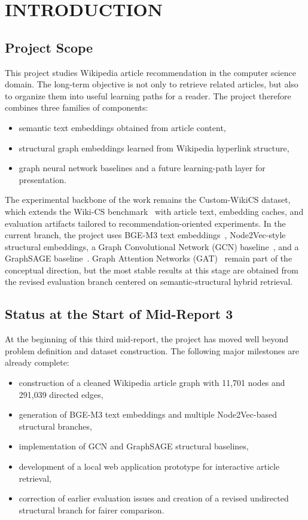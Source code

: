 \chapter{INTRODUCTION}
\thispagestyle{empty}

\section{Project Scope}

This project studies Wikipedia article recommendation in the computer science
domain. The long-term objective is not only to retrieve related articles, but
also to organize them into useful learning paths for a reader. The project
therefore combines three families of components:
\begin{itemize}
    \item semantic text embeddings obtained from article content,
    \item structural graph embeddings learned from Wikipedia hyperlink
    structure,
    \item graph neural network baselines and a future learning-path layer for
    presentation.
\end{itemize}

The experimental backbone of the work remains the Custom-WikiCS dataset, which
extends the Wiki-CS benchmark~\cite{mernyei2020wikics} with article text,
embedding caches, and evaluation artifacts tailored to recommendation-oriented
experiments. In the current branch, the project uses BGE-M3 text
embeddings~\cite{chen2025bgem3}, Node2Vec-style structural embeddings, a
Graph Convolutional Network (GCN) baseline~\cite{kipf2017semi}, and a
GraphSAGE baseline~\cite{hamilton2017inductive}. Graph Attention Networks
(GAT)~\cite{velickovic2018graph} remain part of the conceptual direction, but
the most stable results at this stage are obtained from the revised
evaluation branch centered on semantic-structural hybrid retrieval.

\section{Status at the Start of Mid-Report 3}

At the beginning of this third mid-report, the project has moved well beyond
problem definition and dataset construction. The following major milestones are
already complete:
\begin{itemize}
    \item construction of a cleaned Wikipedia article graph with 11,701 nodes
    and 291,039 directed edges,
    \item generation of BGE-M3 text embeddings and multiple Node2Vec-based
    structural branches,
    \item implementation of GCN and GraphSAGE structural baselines,
    \item development of a local web application prototype for interactive
    article retrieval,
    \item correction of earlier evaluation issues and creation of a revised
    undirected structural branch for fairer comparison.
\end{itemize}

